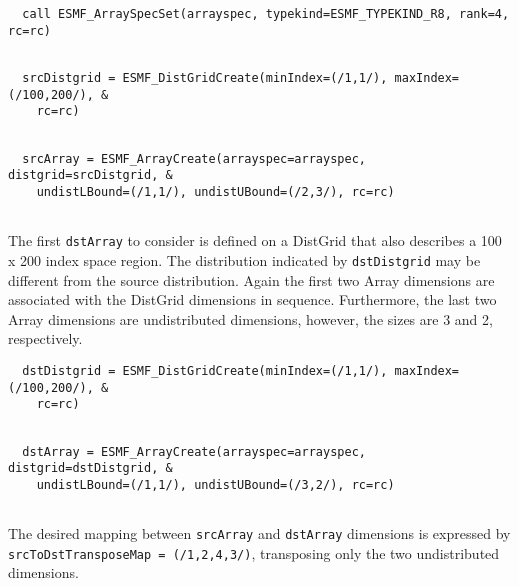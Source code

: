  \begin{verbatim}
  call ESMF_ArraySpecSet(arrayspec, typekind=ESMF_TYPEKIND_R8, rank=4, rc=rc)
 
\end{verbatim}
 

 \begin{verbatim}
  srcDistgrid = ESMF_DistGridCreate(minIndex=(/1,1/), maxIndex=(/100,200/), &
    rc=rc)
 
\end{verbatim}
 

 \begin{verbatim}
  srcArray = ESMF_ArrayCreate(arrayspec=arrayspec, distgrid=srcDistgrid, &
    undistLBound=(/1,1/), undistUBound=(/2,3/), rc=rc)
 
\end{verbatim}
 

   The first {\tt dstArray} to consider is defined on a DistGrid that also 
   describes a 100 x 200 index space region. The distribution indicated
   by {\tt dstDistgrid} may be different from the source distribution. Again
   the first two Array dimensions are associated with the DistGrid dimensions in
   sequence. Furthermore, the last two Array dimensions are undistributed
   dimensions, however, the sizes are 3 and 2, respectively. 

 \begin{verbatim}
  dstDistgrid = ESMF_DistGridCreate(minIndex=(/1,1/), maxIndex=(/100,200/), &
    rc=rc)
 
\end{verbatim}
 

 \begin{verbatim}
  dstArray = ESMF_ArrayCreate(arrayspec=arrayspec, distgrid=dstDistgrid, &
    undistLBound=(/1,1/), undistUBound=(/3,2/), rc=rc)
 
\end{verbatim}
 

   The desired mapping between {\tt srcArray} and {\tt dstArray} dimensions
   is expressed by {\tt srcToDstTransposeMap = (/1,2,4,3/)}, transposing only
   the two undistributed dimensions. 


